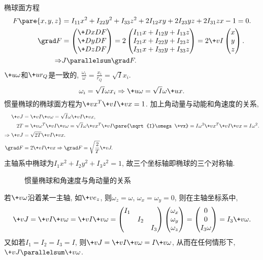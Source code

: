 \documentclass[../LectureNotes.tex]{subfiles}
\begin{document}
椭球面方程
\begin{align*}
    F\pare{x,y,z} &= I_{11}x^2 + I_{22}y^2 + I_{33}z^2 + 2I_{12}xy + 2I_{23}yz + 2I_{31}zx - 1 = 0. \\
    \grad F &= \begin{pmatrix}
        \+DxDF \\
        \+DyDF \\
        \+DzDF
    \end{pmatrix} = 2 \begin{pmatrix}
        I_{11} x + I_{12}y + I_{13}z \\
        I_{21} x + I_{22}y + I_{23}z \\
        I_{31} x + I_{32}y + I_{33}z
    \end{pmatrix} = 2\+vI \begin{pmatrix}
        x \\ y \\ z
    \end{pmatrix}. \\
    \Rightarrow & J \parallelsum \grad F.
\end{align*}
$\+u\omega$和$\+ur_Q$是一致的, $\displaystyle \frac{\omega_i}{\omega} = \frac{x_i}{r_Q} = \sqrt{I}x_i$.
\[ \omega_i = \sqrt{I}\omega x_i \Rightarrow \+u\omega = \sqrt{I}\omega \+ux. \]
惯量椭球的椭球面方程为$\+vx^T \+vI\+vx = 1$. 加上角动量与动能和角速度的关系,
\begin{align*}
    \+vJ &= \+vI\+v\omega = \sqrt{I}\omega \+vI\+vx, \\
    2T &= \+v\omega^T \+vI\+v\omega = \sqrt{I} \omega \+vx^T \+vI \pare{\sqrt{I}\omega\+vx} = I\omega^2 \+vx^T\+vI\+vx = I\omega^2. \\
    \Rightarrow \+vJ &= \sqrt{2T}\+vI\+vx. \\
    \grad F &= 2\+vI\+vx \Rightarrow \grad F = \sqrt{\frac{2}{T}}\+vJ.
\end{align*}
主轴系中椭球为$I_1x^2 + I_2 y^2 + I_3z^2 = 1$, 故三个坐标轴即椭球的三个对称轴.
\par
\begin{figure}[htbp]
    \centering
    \caption{惯量椭球和角速度与角动量的关系}
\end{figure}
若$\+v\omega$沿着某一主轴, 如$\+ve_z$, 则$\omega_z = \omega$, $\omega_x = \omega_y = 0$, 则在主轴坐标系中,
\[ \+vJ = \+vI\+v\omega = \+vI\+v\omega = \begin{pmatrix}
    I_1 & & \\
    & I_2 & \\
    & & I_3
\end{pmatrix}\begin{pmatrix}
    \omega_x \\ \omega_y \\ \omega_z
\end{pmatrix} = \begin{pmatrix}
    0 \\ 0 \\ I_3\omega
\end{pmatrix} = I_3 \+v\omega. \]
又如若$I_1 = I_2 = I_3 = I$, 则$\+vJ = \+vI\+v\omega = I\+v\omega$, 从而在任何情形下, $\+vJ\parallelsum \+v\omega$.
\end{document}
